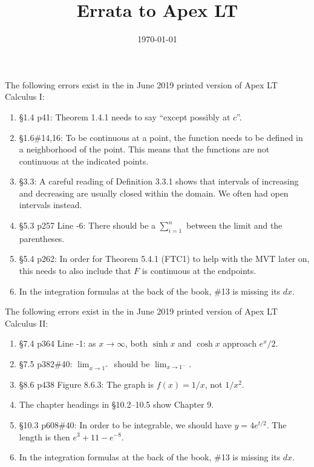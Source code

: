 \documentclass{amsart}
\title{Errata to Apex LT}
\date{\today}
\newcommand{\ds}{\displaystyle}
\begin{document}
\vspace*{-.6in}

\maketitle

\noindent
The following errors exist in the in June 2019 printed version of Apex LT Calculus I:
\begin{enumerate}
\item \S1.4 p41: Theorem 1.4.1 needs to say ``except possibly at $c$''.
\item \S1.6\#14,16: To be continuous at a point, the function needs to be defined in a neighborhood of the point.  This means that the functions are not continuous at the indicated points.
\item \S3.3: A careful reading of Definition 3.3.1 shows that intervals of increasing and decreasing are usually closed within the domain.  We often had open intervals instead.
\item \S5.3 p257 Line -6: There should be a $\ds\sum_{i=1}^n$ between the limit and the parentheses.
\item \S5.4 p262: In order for Theorem 5.4.1 (FTC1) to help with the MVT later on, this needs to also include that $F$ is continuous at the endpoints.
\item In the integration formulas at the back of the book, \#13 is missing its $dx$.
\label{2019-06-00Iplus}
\end{enumerate}

\noindent
The following errors exist in the in June 2019 printed version of Apex LT Calculus II:
\begin{enumerate}
\item \S7.4 p364 Line -1: as $x\to\infty$, both $\sinh x$ and $\cosh x$ approach $e^x/2$.
\item \S7.5 p382\#40: $\ds\lim_{x\to1^+}$ should be $\ds\lim_{x\to1^-}$.
\item \S8.6 p438 Figure 8.6.3: The graph is $f(x)=1/x$, not $1/x^2$.
\item The chapter headings in \S10.2--10.5 show Chapter 9.
\item \S10.3 p608\#40: In order to be integrable, we should have $y=4e^{t/2}$.  The length is then $e^3+11-e^{-8}$.
\item In the integration formulas at the back of the book, \#13 is missing its $dx$.
\label{2019-06-00II}
\end{enumerate}
\end{document}
